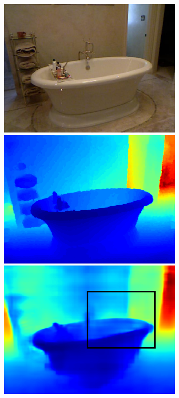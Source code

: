 \begin{figure}[htb]
\begin{subfigure}{0.15\linewidth}
  \begin{minipage}[t]{1\linewidth}
  \centering
  \includegraphics[width=1\linewidth]{figure/nyu_rgb/668.png}
  \includegraphics[width=1\linewidth]{figure/nyu_gt/668.png}
  \includegraphics[width=1\linewidth]{figure/nyu_result/bathroom_rgb_00668.png}

\end{minipage}
\end{subfigure}
\end{figure}
